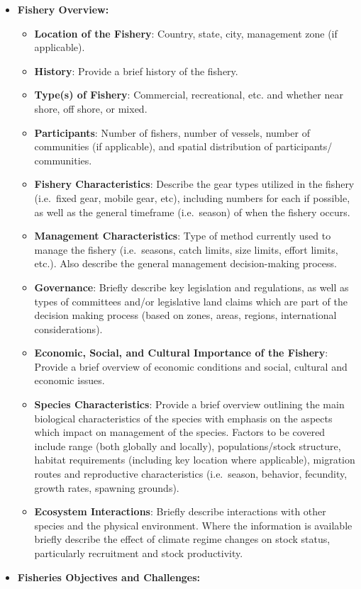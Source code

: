 \documentclass[]{book}
\begin{document}
\begin{itemize}
\item
  \textbf{Fishery Overview:}

  \begin{itemize}
  \item
    \textbf{Location of the Fishery}: Country, state, city, management
    zone (if applicable).
  \item
    \textbf{History}: Provide a brief history of the fishery.
  \item
    \textbf{Type(s) of Fishery}: Commercial, recreational, etc. and
    whether near shore, off shore, or mixed.
  \item
    \textbf{Participants}: Number of fishers, number of vessels, number
    of communities (if applicable), and spatial distribution of
    participants/ communities.
  \item
    \textbf{Fishery Characteristics}: Describe the gear types utilized
    in the fishery (i.e.~fixed gear, mobile gear, etc), including
    numbers for each if possible, as well as the general timeframe
    (i.e.~season) of when the fishery occurs.
  \item
    \textbf{Management Characteristics}: Type of method currently used
    to manage the fishery (i.e.~seasons, catch limits, size limits,
    effort limits, etc.). Also describe the general management
    decision-making process.
  \item
    \textbf{Governance}: Briefly describe key legislation and
    regulations, as well as types of committees and/or legislative land
    claims which are part of the decision making process (based on
    zones, areas, regions, international considerations).
  \item
    \textbf{Economic, Social, and Cultural Importance of the Fishery}:
    Provide a brief overview of economic conditions and social, cultural
    and economic issues.
  \item
    \textbf{Species Characteristics}: Provide a brief overview outlining
    the main biological characteristics of the species with emphasis on
    the aspects which impact on management of the species. Factors to be
    covered include range (both globally and locally), populations/stock
    structure, habitat requirements (including key location where
    applicable), migration routes and reproductive characteristics
    (i.e.~season, behavior, fecundity, growth rates, spawning grounds).
  \item
    \textbf{Ecosystem Interactions}: Briefly describe interactions with
    other species and the physical environment. Where the information is
    available briefly describe the effect of climate regime changes on
    stock status, particularly recruitment and stock productivity.
  \end{itemize}
\item
  \textbf{Fisheries Objectives and Challenges:}
\end{itemize}
\end{document}

